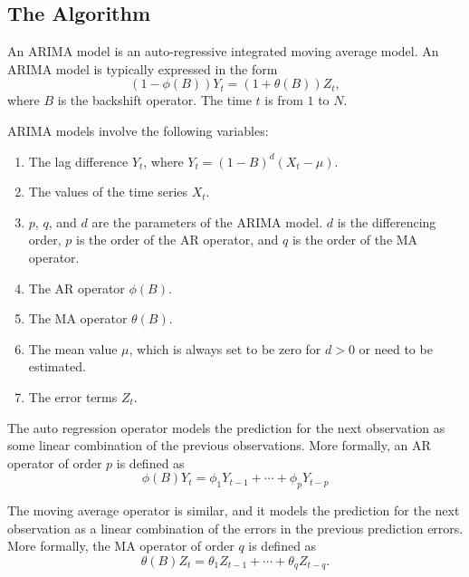 \documentclass[english,10pt]{llncs}
\begin{document}
\subsection{The Algorithm}


An ARIMA model is an auto-regressive integrated moving average model. An ARIMA
model is typically expressed in the form
\begin{equation}
(1 - \phi(B)) Y_t  = (1 + \theta(B)) Z_t,
\end{equation}
where $B$ is the backshift operator. The time $t$ is from $1$ to $N$.

ARIMA models involve the following variables:
\begin{enumerate}
   \item The lag difference $Y_{t}$, where  $Y_{t} = {(1-B)}^{d}(X_{t} - \mu)$.
    \item The values of the time series $X_t$.
    \item $p$, $q$, and $d$ are the parameters of the ARIMA model.
      $d$ is the differencing order, $p$ is the order of the AR
      operator, and $q$ is the order of the MA operator.
    \item The AR operator $\phi(B)$.
    \item The MA operator $\theta(B)$.
    \item The mean value $\mu$, which is always set to be zero for
      $d>0$ or need to be estimated.
    \item The error terms $Z_t$.
\end{enumerate}

The auto regression operator models the prediction for the next
observation as some linear combination of the previous observations.
More formally, an AR operator of order $p$ is defined as
\begin{equation}
\phi(B) Y_t= \phi_1 Y_{t-1}   + \cdots +  \phi_{p} Y_{t-p}
\end{equation}

The moving average operator is similar, and it models the prediction
for the next observation as a linear combination of the errors in the
previous prediction errors.  More formally, the MA operator of order
$q$ is defined as
\begin{equation}
\theta(B) Z_t =   \theta_{1} Z_{t-1} + \cdots + \theta_{q} Z_{t-q}.
\end{equation}
\end{document}

